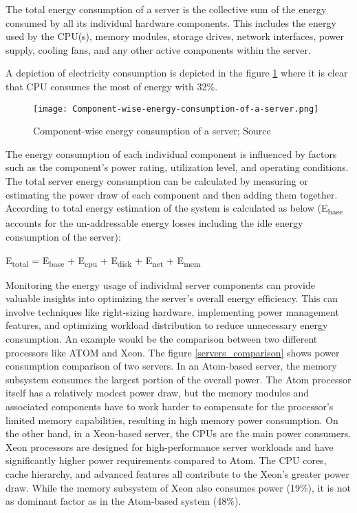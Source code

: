 \documentclass[
  a4paper,  %
  twoside,  %
  bibliography=totoc,
  headsepline,
  cleardoublepage=empty,
  parskip=half,
  draft=false
]{scrbook}
\begin{document}
The total energy consumption of a server is the collective sum of the energy consumed by all its individual hardware components. This includes the energy used by the CPU(s), memory modules, storage drives, network interfaces, power supply, cooling fans, and any other active components within the server\cite{ahmed2021review}. 


A depiction of electricity consumption is depicted in the figure \ref{component_wise_consumption} where it is clear that CPU consumes the most of energy with 32\%.

\begin{figure}
	\centering
	\texttt{[image: Component-wise-energy-consumption-of-a-server.png]}
	\caption{Component-wise energy consumption of a server; Source\cite{ahmed2021review}}
	\label{component_wise_consumption}
\end{figure}

The energy consumption of each individual component is influenced by factors such as the component's power rating, utilization level, and operating conditions. The total server energy consumption can be calculated by measuring or estimating the power draw of each component and then adding them together. According to \cite{chatzipapas2015challenge} total energy estimation of the system is calculated as below (E\textsubscript{base} accounts for the un-addressable energy losses including the idle energy consumption of the server):

\begin{center}
	E\textsubscript{total} = E\textsubscript{base} + E\textsubscript{cpu} + E\textsubscript{disk} + E\textsubscript{net} + E\textsubscript{mem}
\end{center}

Monitoring the energy usage of individual server components can provide valuable insights into optimizing the server's overall energy efficiency. This can involve techniques like right-sizing hardware, implementing power management features, and optimizing workload distribution to reduce unnecessary energy consumption\cite{LIN201847}. An example would be the comparison between two different processors like ATOM and Xeon\cite{iccusaIntelAtom}. The figure \ref{servers_comparison} shows power consumption comparison of two servers.
In an Atom-based server, the memory subsystem consumes the largest portion of the overall power. The Atom processor itself has a relatively modest power draw, but the memory modules and associated components have to work harder to compensate for the processor's limited memory capabilities, resulting in high memory power consumption\cite{turley2014white}. On the other hand, in a Xeon-based server, the CPUs are the main power consumers. Xeon processors are designed for high-performance server workloads and have significantly higher power requirements compared to Atom. The CPU cores, cache hierarchy, and advanced features all contribute to the Xeon's greater power draw. While the memory subsystem of Xeon also consumes power (19\%), it is not as dominant factor as in the Atom-based system (48\%)\cite{servethehomeMemoryBandwidth}.
\end{document}
